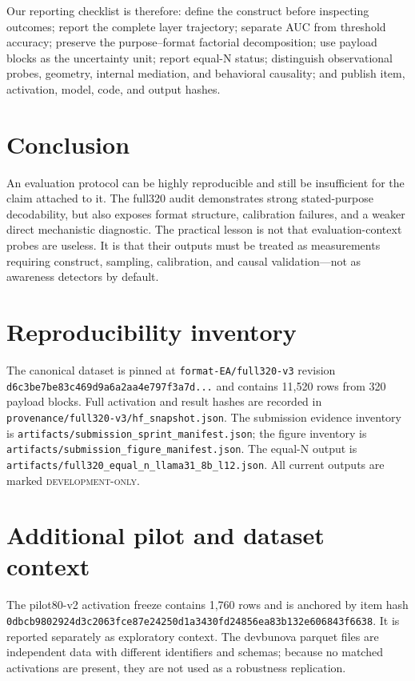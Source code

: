 \documentclass{article}
\newcommand{\dev}{\textsc{development-only}}
\begin{document}
Our reporting checklist is therefore: define the construct before inspecting outcomes; report the complete layer trajectory; separate AUC from threshold accuracy; preserve the purpose--format factorial decomposition; use payload blocks as the uncertainty unit; report equal-N status; distinguish observational probes, geometry, internal mediation, and behavioral causality; and publish item, activation, model, code, and output hashes.

\section{Conclusion}
An evaluation protocol can be highly reproducible and still be insufficient for the claim attached to it. The full320 audit demonstrates strong stated-purpose decodability, but also exposes format structure, calibration failures, and a weaker direct mechanistic diagnostic. The practical lesson is not that evaluation-context probes are useless. It is that their outputs must be treated as measurements requiring construct, sampling, calibration, and causal validation—not as awareness detectors by default.

\appendix
\section{Reproducibility inventory}
The canonical dataset is pinned at \texttt{format-EA/full320-v3} revision \texttt{d6c3be7be83c469d9a6a2aa4e797f3a7d...} and contains 11,520 rows from 320 payload blocks. Full activation and result hashes are recorded in \texttt{provenance/full320-v3/hf\_snapshot.json}. The submission evidence inventory is \texttt{artifacts/submission\_sprint\_manifest.json}; the figure inventory is \texttt{artifacts/submission\_figure\_manifest.json}. The equal-N output is \texttt{artifacts/full320\_equal\_n\_llama31\_8b\_l12.json}. All current outputs are marked \dev.

\section{Additional pilot and dataset context}
The pilot80-v2 activation freeze contains 1,760 rows and is anchored by item hash \texttt{0dbcb9802924d3c2063fce87e24250d1a3430fd24856ea83b132e606843f6638}. It is reported separately as exploratory context. The devbunova parquet files are independent data with different identifiers and schemas; because no matched activations are present, they are not used as a robustness replication.
\end{document}
